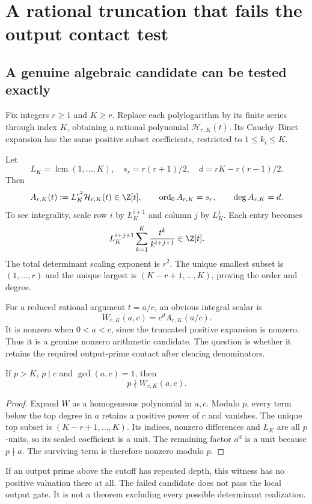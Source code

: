 \clearpage
\section{A rational truncation that fails the output contact test}\label{sec:truncation}
\subsection{A genuine algebraic candidate can be tested exactly}
Fix integers $r\ge1$ and $K\ge r$. Replace each polylogarithm by its finite series through index $K$, obtaining a rational polynomial $\mathcal H_{r,K}(t)$. Its Cauchy--Binet expansion has the same positive subset coefficients, restricted to $1\le k_i\le K$.

Let
\[
 L_K=\operatorname{lcm}(1,\ldots,K),\quad s_r=r(r+1)/2,
 \quad d=rK-r(r-1)/2.
\]
Then
\[
 A_{r,K}(t):=L_K^{r^2}\mathcal H_{r,K}(t)\in\Z[t],
 \qquad \ord_0A_{r,K}=s_r,\qquad \deg A_{r,K}=d.
\]
To see integrality, scale row $i$ by $L_K^{i+1}$ and column $j$ by $L_K^j$. Each entry becomes
\[
 L_K^{i+j+1}\sum_{k=1}^K\frac{t^k}{k^{i+j+1}}\in\Z[t].
\]
The total determinant scaling exponent is $r^2$. The unique smallest subset is $(1,\ldots,r)$ and the unique largest is $(K-r+1,\ldots,K)$, proving the order and degree.

For a reduced rational argument $t=a/c$, an obvious integral scalar is
\[
 W_{r,K}(a,c)=c^dA_{r,K}(a/c).
\]
It is nonzero when $0<a<c$, since the truncated positive expansion is nonzero. Thus it is a genuine nonzero arithmetic candidate. The question is whether it retains the required output-prime contact after clearing denominators.

\begin{theorem}\label{thm:truncation-failure}
If $p>K$, $p\mid c$ and $\gcd(a,c)=1$, then
\[
 p\nmid W_{r,K}(a,c).
\]
\end{theorem}
\begin{proof}
Expand $W$ as a homogeneous polynomial in $a,c$. Modulo $p$, every term below the top degree in $a$ retains a positive power of $c$ and vanishes. The unique top subset is $(K-r+1,\ldots,K)$. Its indices, nonzero differences and $L_K$ are all $p$-units, so its scaled coefficient is a unit. The remaining factor $a^d$ is a unit because $p\nmid a$. The surviving term is therefore nonzero modulo $p$.
\end{proof}
If an output prime above the cutoff has repeated depth, this witness has no positive valuation there at all. The failed candidate does not pass the local output gate. It is not a theorem excluding every possible determinant realization.

